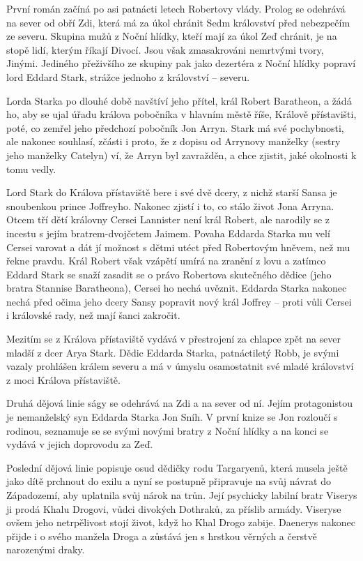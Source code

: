 \documentclass[../ctenarsky-denik.tex]{subfiles}
\begin{document}


První román začíná po asi patnácti letech Robertovy vlády. Prolog se odehrává na sever od obří Zdi, která má za úkol chránit Sedm království před nebezpečím ze severu. Skupina mužů z Noční hlídky, kteří mají za úkol Zeď chránit, je na stopě lidí, kterým říkají Divocí. Jsou však zmasakrováni nemrtvými tvory, Jinými. Jediného přeživšího ze skupiny pak jako dezertéra z Noční hlídky popraví lord Eddard Stark, strážce jednoho z království – severu.

Lorda Starka po dlouhé době navštíví jeho přítel, král Robert Baratheon, a žádá ho, aby se ujal úřadu králova pobočníka v hlavním městě říše, Králově přístavišti, poté, co zemřel jeho předchozí pobočník Jon Arryn. Stark má své pochybnosti, ale nakonec souhlasí, zčásti i proto, že z dopisu od Arrynovy manželky (sestry jeho manželky Catelyn) ví, že Arryn byl zavražděn, a chce zjistit, jaké okolnosti k tomu vedly.

Lord Stark do Králova přístaviště bere i své dvě dcery, z nichž starší Sansa je snoubenkou prince Joffreyho. Nakonec zjistí i to, co stálo život Jona Arryna. Otcem tří dětí královny Cersei Lannister není král Robert, ale narodily se z incestu s jejím bratrem-dvojčetem Jaimem. Povaha Eddarda Starka mu velí Cersei varovat a dát jí možnost s dětmi utéct před Robertovým hněvem, než mu řekne pravdu. Král Robert však vzápětí umírá na zranění z lovu a zatímco Eddard Stark se snaží zasadit se o právo Robertova skutečného dědice (jeho bratra Stannise Baratheona), Cersei ho nechá uvěznit. Eddarda Starka nakonec nechá před očima jeho dcery Sansy popravit nový král Joffrey – proti vůli Cersei i královské rady, než mají šanci zakročit.

Mezitím se z Králova přístaviště vydává v přestrojení za chlapce zpět na sever mladší z dcer Arya Stark. Dědic Eddarda Starka, patnáctiletý Robb, je svými vazaly prohlášen králem severu a má v úmyslu osamostatnit své mladé království z moci Králova přístaviště.

Druhá dějová linie ságy se odehrává na Zdi a na sever od ní. Jejím protagonistou je nemanželský syn Eddarda Starka Jon Sníh. V první knize se Jon rozloučí s rodinou, seznamuje se se svými novými bratry z Noční hlídky a na konci se vydává v jejich doprovodu za Zeď.

Poslední dějová linie popisuje osud dědičky rodu Targaryenů, která musela ještě jako dítě prchnout do exilu a nyní se postupně připravuje na svůj návrat do Západozemí, aby uplatnila svůj nárok na trůn. Její psychicky labilní bratr Viserys ji prodá Khalu Drogovi, vůdci divokých Dothraků, za příslib armády. Viseryse ovšem jeho netrpělivost stojí život, když ho Khal Drogo zabije. Daenerys nakonec přijde i o svého manžela Droga a zůstává jen s hrstkou věrných a čerstvě narozenými draky.
\end{document}
